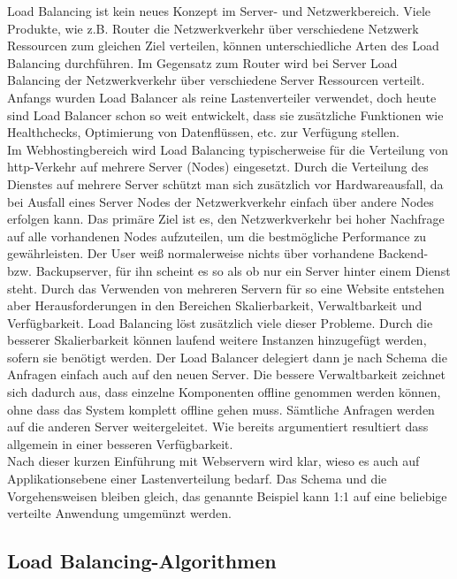 \documentclass[letterpaper, 12pt]{article}
\let\tempsubsection\subsection
\renewcommand\subsection[1]{\vspace{0cm}\tempsubsection{#1}\vspace{0cm}}
\begin{document}
Load Balancing ist kein neues Konzept im Server- und Netzwerkbereich. Viele Produkte, wie z.B.
Router die Netzwerkverkehr über verschiedene Netzwerk Ressourcen zum gleichen Ziel verteilen,
können unterschiedliche Arten des Load Balancing durchführen. Im Gegensatz zum Router wird bei
Server Load Balancing der Netzwerkverkehr über verschiedene Server Ressourcen verteilt. Anfangs
wurden Load Balancer als reine Lastenverteiler verwendet, doch heute sind Load Balancer schon so
weit entwickelt, dass sie zusätzliche Funktionen wie Healthchecks, Optimierung von Datenflüssen,
etc. zur Verfügung stellen. \\
Im Webhostingbereich wird Load Balancing typischerweise für die Verteilung von http-Verkehr auf
mehrere Server (Nodes) eingesetzt. Durch die Verteilung des Dienstes auf mehrere Server schützt man
sich zusätzlich vor Hardwareausfall, da bei Ausfall eines Server Nodes der Netzwerkverkehr einfach
über andere Nodes erfolgen kann. Das primäre Ziel ist es, den Netzwerkverkehr bei hoher Nachfrage
auf alle vorhandenen Nodes aufzuteilen, um die bestmögliche Performance zu gewährleisten. Der
User weiß normalerweise nichts über vorhandene Backend- bzw. Backupserver, für ihn scheint es
so als ob nur ein Server hinter einem Dienst steht. Durch das Verwenden von
mehreren Servern für so eine Website entstehen aber Herausforderungen in den Bereichen Skalierbarkeit,
Verwaltbarkeit und Verfügbarkeit. Load Balancing löst zusätzlich viele dieser Probleme. Durch die besserer Skalierbarkeit können laufend weitere Instanzen hinzugefügt werden, sofern sie benötigt werden. Der Load Balancer delegiert dann je nach Schema die Anfragen einfach auch auf den neuen Server. Die bessere Verwaltbarkeit zeichnet sich dadurch aus, dass einzelne Komponenten offline genommen werden können, ohne dass das System komplett offline gehen muss. Sämtliche Anfragen werden auf die anderen Server weitergeleitet. Wie bereits argumentiert resultiert dass allgemein in einer besseren Verfügbarkeit. \\
Nach dieser kurzen Einführung mit Webservern wird klar, wieso es auch auf Applikationsebene einer Lastenverteilung bedarf. Das Schema und die Vorgehensweisen bleiben gleich, das genannte Beispiel kann 1:1 auf eine beliebige verteilte Anwendung umgemünzt werden. \cite{ausarbeitunglb}

\subsection{Load Balancing-Algorithmen}
\end{document}
